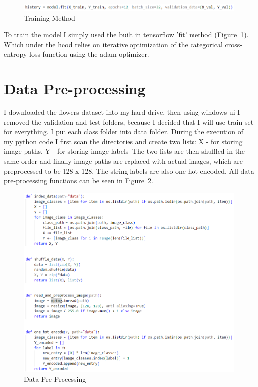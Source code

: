 \documentclass{article}
\begin{document}
\begin{figure}[H]
    \centering
    \includegraphics[width=1\textwidth]{training.png}
    \caption{Training Method}
    \label{fig:training}
\end{figure}
To train the model I simply used the built in tensorflow 'fit' method (Figure~\ref{fig:training}). Which under the hood relies on iterative optimization of the categorical cross-entropy loss function using the adam optimizer.

\section*{Data Pre-processing}
I downloaded the flowers dataset into my hard-drive, then using windows ui I removed the validation and test folders, because I decided that I will use train set for everything. I put each class folder into data folder. During the execution of my python code I first scan the directories and create two lists: X - for storing image paths, Y - for storing image labels. The two lists are then shuffled in the same order and finally image paths are replaced with actual images, which are preprocessed to be 128 x 128. The string labels are also one-hot encoded. All data pre-processing functions can be seen in Figure~\ref{fig:preprocess}.
\begin{figure}[H]
    \centering
    \includegraphics[width=1\textwidth]{preprocess.png}
    \caption{Data Pre-Processing}
    \label{fig:preprocess}
\end{figure}
\end{document}
